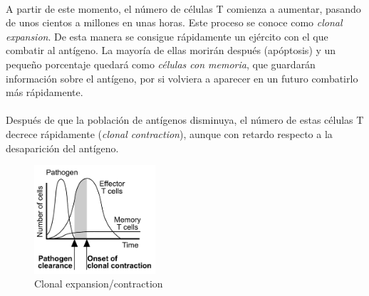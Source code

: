 \documentclass{article}
\begin{document}
 	 \\
 	 A partir de este momento, el número de células T comienza a aumentar, pasando de unos cientos a millones en unas horas. Este proceso se conoce como \textit{clonal expansion}. De esta manera se consigue rápidamente un ejército con el que combatir al antígeno. La mayoría de ellas morirán después (apóptosis) y un pequeño porcentaje quedará como \textit{células con memoria}, que guardarán información sobre el antígeno, por si volviera a aparecer en un futuro combatirlo más rápidamente.
 	 \\
 	 \\
 	 Después de que la población de antígenos disminuya, el número de estas células T decrece rápidamente (\textit{clonal contraction}), aunque con retardo respecto a la desaparición del antígeno.
 	 
 	 \begin{figure}[h!]
 	 	\centering
 	 	\includegraphics[width=0.4\textwidth]{clonalExpContr}
 	 	\caption{Clonal expansion/contraction}
 	 	\label{fig:ejemplo}
 	 \end{figure}
	 
\end{document}
